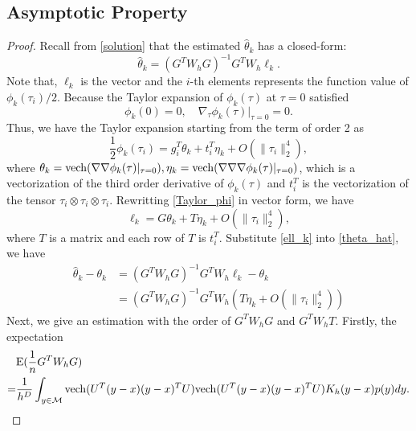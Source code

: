 \documentclass[aos,preprint]{imsart}
\theoremstyle{remark}
\begin{document}
\begin{appendix}
\section{}
\subsection{Asymptotic Property}
\begin{proof}
Recall from \eqref{solution} that the estimated $\hat{\theta}_k$ has a closed-form:
\begin{equation}\label{theta_hat}
\hat{\theta}_k = (G^TW_hG)^{-1} G^T W_h\ell_k.
\end{equation}
Note that, $\ell_k$ is the vector and the $i$-th elements represents  the function value of $\phi_k(\tau_i)/2$. Because the Taylor expansion of $\phi_k(\tau)$ at $\tau=0$ satisfied
\[
\phi_k(0) = 0, \quad \nabla_\tau \phi_k(\tau)|_{\tau=0} = 0.
\]
Thus, we have the Taylor expansion starting from the term of order 2 as
\begin{equation}\label{Taylor_phi}
\frac{1}{2}\phi_k(\tau_i) = g_i^T\theta_k+t_i^T \eta_k+O(\|\tau_i\|_2^4),
\end{equation}
where $\theta_k = {\rm vech}(\nabla\nabla\phi_k(\tau)|_{\tau=0}), \eta_k={\rm vech}(\nabla\nabla\nabla\phi_k(\tau)|_{\tau=0})$, which is a vectorization of the third order derivative of $\phi_k(\tau)$ and $t_i^T$ is the vectorization of the tensor $\tau_i\otimes \tau_i\otimes \tau_i$. Rewritting \eqref{Taylor_phi} in vector form, we have
\begin{equation}\label{ell_k}
\ell_k = G\theta_k+T\eta_k+O(\|\tau_i\|_2^4),
\end{equation}
where $T$ is a matrix and each row of $T$ is $t_i^T$. Substitute \eqref{ell_k} into \eqref{theta_hat}, we have
\[
\begin{aligned}
\hat{\theta}_k - \theta_k &= (G^TW_hG)^{-1} G^T W_h\ell_k - \theta_k\\
&= (G^TW_hG)^{-1} G^T W_h(T\eta_k+O(\|\tau_i\|_2^4))
\end{aligned}
\]
Next, we give an estimation with the order of $G^TW_hG$ and $G^T W_hT$. Firstly, the expectation
\[
\begin{aligned}
&{\rm E} (\frac{1}{n}G^TW_hG) \\
= &\frac{1}{h^D}\int_{y\in {\cal M}} {\rm vech}(U^T(y-x) (y-x)^T U)  {\rm vech}(U^T(y-x) (y-x)^T U) K_h(y-x)p(y)d y.

\end{aligned}\]
\end{proof}
\end{appendix}
\end{document}
